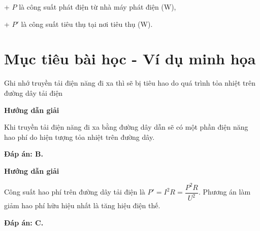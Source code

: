 	+ $P$ là công suất phát điện từ nhà máy phát điện (W),
	
	+ $P'$ là công suất tiêu thụ tại nơi tiêu thụ (W).

\section{Mục tiêu bài học - Ví dụ minh họa}
\begin{dang}{Ghi nhớ truyền tải điện năng đi xa thì sẽ bị tiêu hao do quá trình tỏa nhiệt trên đường dây tải điện}
	
	{\begin{center}
			\textbf{Hướng dẫn giải}
		\end{center}
		
		Khi truyền tải điện năng đi xa bằng đường dây dẫn sẽ có một phần điện năng hao phí do hiện tượng tỏa nhiệt trên đường dây.
		
		\textbf{Đáp án: B.}
	}
	{\begin{center}
			\textbf{Hướng dẫn giải}
		\end{center}
		
		Công suất hao phí trên đường dây tải điện là $P'=I^2R=\dfrac{P^2R}{U^2}.$ Phương án làm giảm hao phí hữu hiệu nhất là tăng hiệu điện thế.
		
		\textbf{Đáp án: C.}
	}
	
\end{dang}
